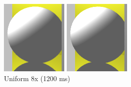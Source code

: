 \begin{figure}[H]
    \includegraphics[width=\linewidth]{img/antialiasing/super8x.png}
    \caption{Uniform 8x (1200 ms)}
\endminipage\hfill
{}
    \centering
    \includegraphics[width=\linewidth]{img/antialiasing/sto8x.png}

\end{figure}
